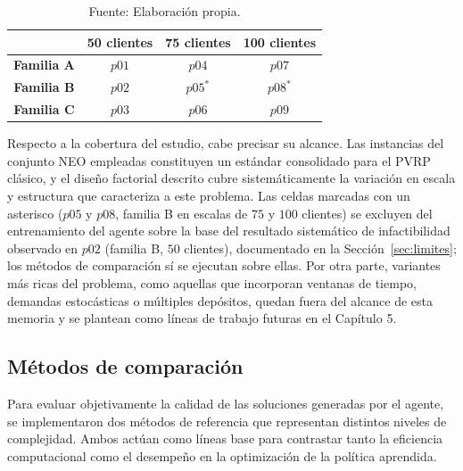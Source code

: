 \begin{table}[H]
    \centering
    \caption{\label{table:CoberturaFactorial} Diseño factorial $3 \times 3$ de la evaluación: familia estructural por escala de clientes.}
    \caption*{Fuente: Elaboración propia.}
    \renewcommand{\arraystretch}{1.25}
    \setlength{\tabcolsep}{12pt}
    \begin{tabular}{@{}cccc@{}}
        \toprule
        & \textbf{50 clientes} & \textbf{75 clientes} & \textbf{100 clientes} \\
        \midrule
        \textbf{Familia A} & $p01$ & $p04$ & $p07$ \\
        \textbf{Familia B} & $p02$ & $p05^{*}$ & $p08^{*}$ \\
        \textbf{Familia C} & $p03$ & $p06$ & $p09$ \\
        \bottomrule
    \end{tabular}
\end{table}

Respecto a la cobertura del estudio, cabe precisar su alcance. Las instancias del conjunto NEO empleadas constituyen un estándar consolidado para el PVRP clásico, y el diseño factorial descrito cubre sistemáticamente la variación en escala y estructura que caracteriza a este problema. Las celdas marcadas con un asterisco ($p05$ y $p08$, familia B en escalas de $75$ y $100$ clientes) se excluyen del entrenamiento del agente sobre la base del resultado sistemático de infactibilidad observado en $p02$ (familia B, $50$ clientes), documentado en la Sección~\ref{sec:limites}; los métodos de comparación sí se ejecutan sobre ellas. Por otra parte, variantes más ricas del problema, como aquellas que incorporan ventanas de tiempo, demandas estocásticas o múltiples depósitos, quedan fuera del alcance de esta memoria y se plantean como líneas de trabajo futuras en el Capítulo 5. 


\subsection{Métodos de comparación} \label{sec:Metodosdecomparacion}
Para evaluar objetivamente la calidad de las soluciones generadas por el agente, se implementaron dos métodos de referencia que representan distintos niveles de complejidad. Ambos actúan como líneas base para contrastar tanto la eficiencia computacional como el desempeño en la optimización de la política aprendida.

